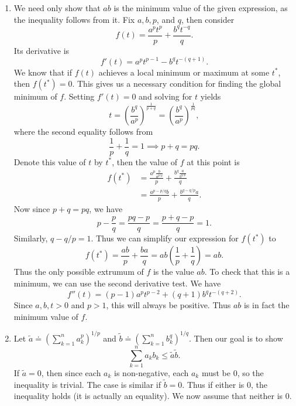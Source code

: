 \documentclass[10pt]{amsart}
\begin{document}
\begin{enumerate}
	\item
		We need only show that $ab$ is the minimum value of the given expression, as the inequality follows from it. Fix $a,b,p$, and $q$, then consider
		\[
			f(t) = \frac{a^p t^p}{p} + \frac{b^q t^{-q}}{q} .
		\] Its derivative is
		\[
			f'(t) = a^pt^{p-1} - b^q t^{-(q+1)}.
		\] We know that if $f(t)$ achieves a local minimum or maximum at some $t^*$, then $f(t^*) = 0$. This gives us a necessary condition for finding the global minimum of $f$. Setting $f'(t)=0$ and solving for $t$ yields
		\[
			t = \left( \frac{b^q}{a^p}  \right)^{\frac{1}{p+q} } = \left( \frac{b^q}{a^p}  \right)^{\frac{1}{pq} },
		\] 
		where the second equality follows from
		\[
		\frac{1}{p} + \frac{1}{q} =1 \implies p+q = pq.
		\] 
		Denote this value of $t$ by $t^*$, then the value of $f$ at this point is
		\begin{align*}
			f(t^*) &= \frac{a^p \frac{b}{a^{p/q}} }{p} + \frac{b^q \frac{a}{b^{q/p}} }{q} \\
			       &= \frac{a^{p-p/q}b}{p} + \frac{b^{q-q/p}a}{q}.
		\end{align*}
		Now since $p+q=pq$, we have
		\[
		p - \frac{p}{q} = \frac{pq-p}{q} = \frac{p+q-p}{q} =1.
	\] Similarly, $q - q/p=1$. Thus we can simplify our expression for $f(t^*)$ to 
	\[
		f(t^*) = \frac{ab}{p} + \frac{ba}{q} = ab \left( \frac{1}{p} +\frac{1}{q}  \right)= ab.
	\] Thus the only possible extrumum of $f$ is the value $ab$. To check that this is a minimum, we can use the second derivative test. We have
	\[
		f''(t) = (p-1) a^p t^{p-2}+ (q+1) b^q t^{-(q+2)}.
	\] Since $a,b,t>0$ and $p>1$, this will always be positive. Thus $ab$ is in fact the minimum value of $f$.

\item Let $\tilde{a}\doteq \left( \sum_{k=1}^{n} a_k^p\right)^{1/p}$ and $\tilde{b} \doteq \left( \sum_{k=1}^{n} b_k^q \right)^{1/q}$. Then our goal is to show \[
\sum_{k=1}^{n} a_k b_k \leq \tilde{a} \tilde{b}.
\] If $\tilde{a}=0$, then since each $a_k$ is non-negative, each $a_k$ must be 0, so the inequality is trivial. The case is similar if $\tilde{b}=0$. Thus if either is 0, the inequality holds (it is actually an equality). We now assume that neither is 0.


\end{enumerate}
\end{document}
